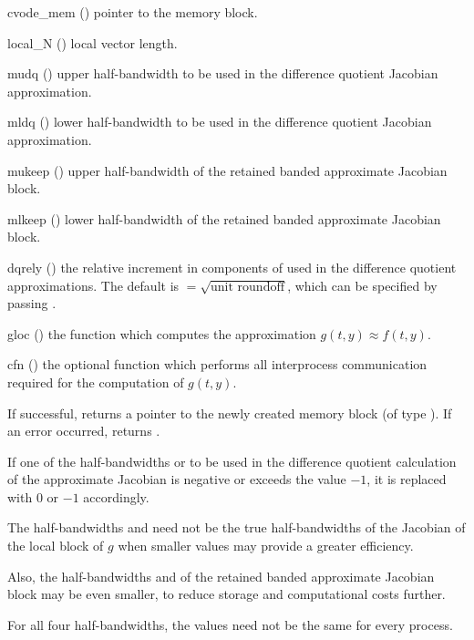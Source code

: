 {
  \begin{args}
  \item[cvode\_mem] ()
    pointer to the {\cvodes} memory block.
  \item[local\_N] ()
    local vector length.
  \item[mudq] ()
    upper half-bandwidth to be used in the difference quotient Jacobian approximation.
  \item[mldq] ()
    lower half-bandwidth to be used in the difference quotient Jacobian approximation.
  \item[mukeep] ()
    upper half-bandwidth of the retained banded approximate Jacobian block.
  \item[mlkeep] ()
    lower half-bandwidth of the retained banded approximate Jacobian block.
  \item[dqrely] ()
    the relative increment in components of  used in the difference quotient
    approximations.  The default is $ = \sqrt{\text{unit roundoff}}$,
    which can be specified by passing .
  \item[gloc] ()
    the {\C} function which computes the approximation $g(t,y) \approx f(t,y)$. 
  \item[cfn] ()
    the optional {\C} function which performs all interprocess communication required for
    the computation of $g(t,y)$.
  \end{args}
}
{
  If successful,  returns a pointer to the newly created 
  {\cvbbdpre} memory block (of type ).
  If an error occurred,  returns .
}
{
  If one of the half-bandwidths  or  to be used in the 
  difference quotient calculation of the approximate Jacobian is negative or 
  exceeds the value $-1$, it is replaced with 0 or
  $-1$ accordingly.

  The half-bandwidths  and  need not be the true 
  half-bandwidths of the Jacobian of the local block of $g$    
  when smaller values may provide a greater efficiency.       

  Also, the half-bandwidths  and  of the retained 
  banded approximate Jacobian block may be even smaller,      
  to reduce storage and computational costs further.            

  For all four half-bandwidths, the values need not be the    
  same for every process.
}
